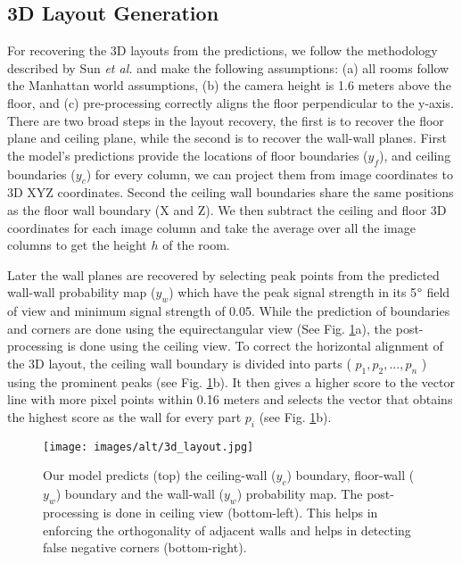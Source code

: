 \documentclass[final]{cvpr}
\begin{document}
\subsection{3D Layout Generation}\label{subsec:3D}
For recovering the 3D layouts from the predictions, we follow the methodology described by Sun \textit{et al.} \cite{sun2019horizonnet} and make the following assumptions: (a) all rooms follow the Manhattan world assumptions, (b) the camera height is 1.6 meters \cite{zhang2014panocontext} above the floor, and (c) pre-processing \cite{zou2018layoutnet} correctly aligns the floor perpendicular to the y-axis. There are two broad steps in the layout recovery, the first is to recover the floor plane and ceiling plane, while the second is to recover the wall-wall planes. First the model's predictions provide the locations of floor boundaries ($y_{f}$), and ceiling boundaries ($y_{c}$) for every column, we can project them from image coordinates to 3D XYZ coordinates. Second the ceiling wall boundaries share the same positions as the floor wall boundary (X and Z). We then subtract the ceiling and floor 3D coordinates for each image column and take the average over all the image columns to get the height $h$ of the room.


Later the wall planes are recovered by selecting peak points from the predicted wall-wall probability map ($y_w$) which have the peak signal strength in its 5$\degree$ field of view and minimum signal strength of 0.05. While the prediction of boundaries and corners are done using the equirectangular view (See Fig. \ref{fig:3d_layout}a), the post-processing is done using the ceiling view. To correct the horizontal alignment of the 3D layout, the ceiling wall boundary is divided into parts ( $p_1, p_2, ..., p_n$ ) using the prominent peaks (see Fig. \ref{fig:3d_layout}b). It then gives a higher score to the vector line with more pixel points within 0.16 meters and selects the vector that obtains the highest score as the wall for every part $p_i$ (see Fig. \ref{fig:3d_layout}b). 



\begin{figure}[!t]
    \centering
    \texttt{[image: images/alt/3d\_layout.jpg]}
    \caption{Our model predicts (top) the ceiling-wall ($y_c$) boundary, floor-wall ($y_w$) boundary and the wall-wall ($y_w$) probability map. The post-processing is done in ceiling view (bottom-left). This helps in enforcing the orthogonality of adjacent walls and helps in detecting false negative corners (bottom-right).}
    \label{fig:3d_layout}
\end{figure}
\end{document}
